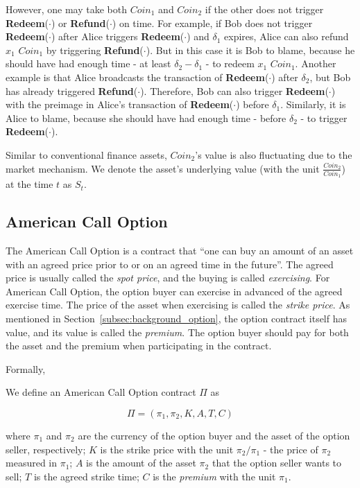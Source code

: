 However, one may take both $Coin_1$ and $Coin_2$ if the other does not trigger \textbf{Redeem}($\cdot$) or \textbf{Refund}($\cdot$) on time.
For example, if Bob does not trigger \textbf{Redeem}($\cdot$) after Alice triggers \textbf{Redeem}($\cdot$) and $\delta_1$ expires, Alice can also refund $x_1$ $Coin_1$ by triggering \textbf{Refund}($\cdot$).
But in this case it is Bob to blame, because he should have had enough time - at least $\delta_2 - \delta_1$  - to redeem $x_1$ $Coin_1$.
Another example is that Alice broadcasts the transaction of \textbf{Redeem}($\cdot$) after $\delta_2$, but Bob has already triggered \textbf{Refund}($\cdot$).
Therefore, Bob can also trigger \textbf{Redeem}($\cdot$) with the preimage in Alice's transaction of \textbf{Redeem}($\cdot$) before $\delta_1$.
Similarly, it is Alice to blame, because she should have had enough time - before $\delta_2$ - to trigger \textbf{Redeem}($\cdot$).

Similar to conventional finance assets, $Coin_2$'s value is also fluctuating due to the market mechanism.
We denote the asset's underlying value (with the unit $\frac{Coin_2}{Coin_1}$) at the time $t$ as $S_t$.















\subsection{American Call Option}

The American Call Option is a contract that ``one can buy an amount of an asset with an agreed price prior to or on an agreed time in the future''. 
The agreed price is usually called the \textit{spot price}, and the buying is called \textit{exercising}.
For American Call Option, the option buyer can exercise in advanced of the agreed exercise time.
The price of the asset when exercising is called the \textit{strike price}.
As mentioned in Section~\ref{subsec:background_option}, the option contract itself has value, and its value is called the \textit{premium}.
The option buyer should pay for both the asset and the premium when participating in the contract.

Formally,

\begin{definition}
We define an American Call Option contract $\Pi$ as

$$\Pi = (\pi_1, \pi_2, K, A, T, C)$$

where
$\pi_1$ and $\pi_2$ are the currency of the option buyer and the asset of the option seller, respectively; 
$K$ is the strike price with the unit $\pi_2 / \pi_1$ - the price of $\pi_2$ measured in $\pi_1$;
$A$ is the amount of the asset $\pi_2$ that the option seller wants to sell;
$T$ is the agreed strike time;
$C$ is the \textit{premium} with the unit $\pi_1$.
\end{definition}

